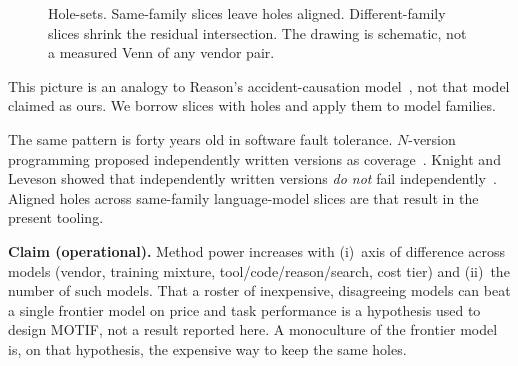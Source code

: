 \documentclass[11pt]{article}
\begin{document}
\begin{figure}[h]
\centering
{}
\caption{Hole-sets. Same-family slices leave holes aligned.
Different-family slices shrink the residual intersection. The drawing
is schematic, not a measured Venn of any vendor pair.}
\end{figure}

This picture is an analogy to Reason's accident-causation
model~\cite{reason1990,reason2000}, not that model claimed as ours.
We borrow slices with holes and apply them to model families.

The same pattern is forty years old in software fault tolerance.
$N$-version programming proposed independently written versions as
coverage~\cite{avizienis}. Knight and Leveson showed that independently
written versions \emph{do not} fail independently~\cite{knightleveson}.
Aligned holes across same-family language-model slices are that result
in the present tooling.

\textbf{Claim (operational).} Method power increases with (i)~axis of
difference across models (vendor, training mixture,
tool/code/reason/search, cost tier) and (ii)~the number of such models.
That a roster of inexpensive, disagreeing models can beat a single
frontier model on price and task performance is a hypothesis used to
design MOTIF, not a result reported here. A monoculture of the
frontier model is, on that hypothesis, the expensive way to keep the
same holes.
\end{document}
